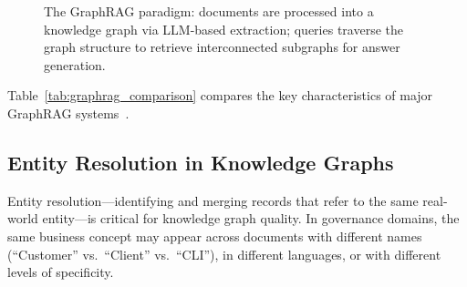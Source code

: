 \begin{figure}[htbp]
\centering
{}
\caption{The GraphRAG paradigm: documents are processed into a knowledge graph via LLM-based extraction; queries traverse the graph structure to retrieve interconnected subgraphs for answer generation.}
\label{fig:graphrag}
\end{figure}

Table~\ref{tab:graphrag_comparison} compares the key characteristics of major GraphRAG systems~\cite{edge2025localglobalgraphrag, guo2024lightrag, hu2025graggraphretrievalaugmentedgeneration}.

\begin{table}[htbp]
\centering
\caption{Comparison of GraphRAG systems.}
\label{tab:graphrag_comparison}
\end{table}

\subsection{Entity Resolution in Knowledge Graphs}
\label{sec:rw:entity_resolution}

Entity resolution---identifying and merging records that refer to the same real-world entity---is critical for knowledge graph quality. In governance domains, the same business concept may appear across documents with different names (``Customer'' vs.\ ``Client'' vs.\ ``CLI''), in different languages, or with different levels of specificity.

